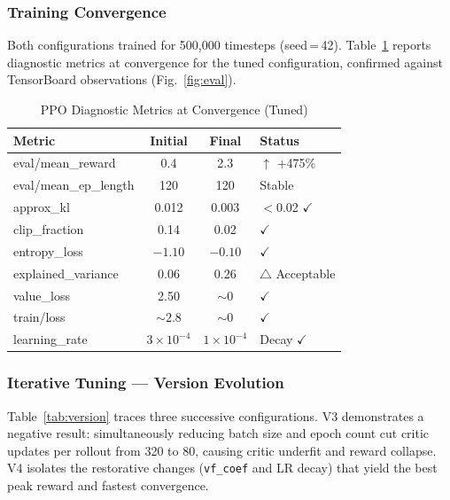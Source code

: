 \documentclass[conference]{IEEEtran}
\begin{document}
\subsubsection{Training Convergence}

Both configurations trained for 500,000 timesteps (seed\,=\,42).
Table~\ref{tab:ppo_diag} reports diagnostic metrics at convergence for the
tuned configuration, confirmed against TensorBoard observations
(Fig.~\ref{fig:eval}).

\begin{table}[htbp]
\caption{PPO Diagnostic Metrics at Convergence (Tuned)}
\label{tab:ppo_diag}
\centering
\small
\begin{tabular}{lccl}
\toprule
\textbf{Metric} & \textbf{Initial} & \textbf{Final} & \textbf{Status} \\
\midrule
eval/mean\_reward    & 0.4    & 2.3     & $\uparrow$ +475\% \\
eval/mean\_ep\_length & 120   & 120     & Stable \\
approx\_kl           & 0.012  & 0.003   & $<$0.02 $\checkmark$ \\
clip\_fraction       & 0.14   & 0.02    & $\checkmark$ \\
entropy\_loss        & $-1.10$ & $-0.10$ & $\checkmark$ \\
explained\_variance  & 0.06   & 0.26    & $\triangle$ Acceptable \\
value\_loss          & 2.50   & ${\sim}0$ & $\checkmark$ \\
train/loss           & ${\sim}2.8$ & ${\sim}0$ & $\checkmark$ \\
learning\_rate       & $3{\times}10^{-4}$ & $1{\times}10^{-4}$ & Decay $\checkmark$ \\
\bottomrule
\end{tabular}
\end{table}

\subsubsection{Iterative Tuning --- Version Evolution}

Table~\ref{tab:version} traces three successive configurations. V3 demonstrates
a negative result: simultaneously reducing batch size and epoch count cut critic
updates per rollout from 320 to 80, causing critic underfit and reward collapse.
V4 isolates the restorative changes (\texttt{vf\_coef} and LR decay) that yield
the best peak reward and fastest convergence.
\end{document}
